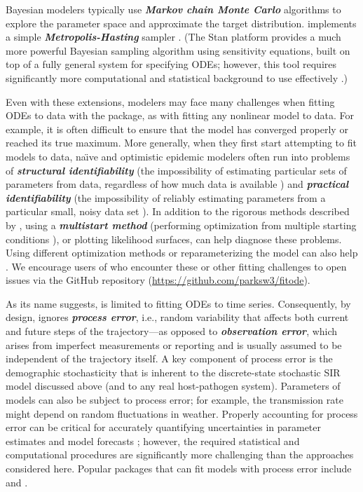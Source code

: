 \documentclass[]{interact}\usepackage[]{graphicx}\usepackage[]{xcolor}
\theoremstyle{plain}%
\theoremstyle{definition}
\theoremstyle{remark}
\newcommand{\term}[1]{{\bfseries\slshape#1}}
\newcommand{\code}[1]{\texttt{\detokenize{#1}}}
\begin{document}
\begin{description}
  Bayesian modelers typically use \term{Markov chain Monte Carlo}
  algorithms to explore the parameter space and approximate the target
  distribution. \code{fitode} implements a simple
  \term{Metropolis-Hasting} sampler \citep[\S7.3.1]{Bolk08}.  (The
  Stan platform provides a much more powerful Bayesian sampling
  algorithm using sensitivity equations, built on top of a fully
  general system for specifying ODEs; however, this tool requires
  significantly more computational and statistical background to use
  effectively \citep{Grin+2021}.)

\end{description}

Even with these extensions, modelers may face many challenges when
fitting ODEs to data with the \code{fitode} package, as with fitting
any nonlinear model to data.  For example, it is often difficult to
ensure that the model has converged properly or reached its true
maximum.  More generally, 
when they first
start attempting to fit models to data,
na\"{\i}ve and optimistic epidemic modelers often
run into problems of \term{structural identifiability} (the
impossibility of estimating particular sets of parameters from data,
regardless of how much data is available
\citep{TuncTrang2018,Chow+2023}) and \term{practical identifiability}
(the impossibility of reliably estimating parameters from a particular
small, noisy data set \citep{Gall+2022, Chow+2023}).  In addition to the rigorous
methods described by \citet{Chow+2023}, using a \term{multistart
  method} (performing optimization from multiple starting conditions
\citep{raue2013lessons}), or plotting likelihood surfaces, can help
diagnose these problems.  Using different optimization methods or
reparameterizing the model can also help
\citep{raue2013lessons,Bolk+2013}.  We encourage users of
\code{fitode} who encounter these or other fitting challenges to open
issues via the \code{fitode} GitHub repository
(\url{https://github.com/parksw3/fitode}).

As its name suggests, \code{fitode} is limited to fitting ODEs to time
series.  Consequently, by design, \code{fitode} ignores \term{process
  error}, i.e., random variability that affects both current and
future steps of the trajectory---as opposed to \term{observation
  error}, which arises from imperfect measurements or reporting and is
usually assumed to be independent of the trajectory itself.  A key
component of process error is the demographic stochasticity that is
inherent to the discrete-state stochastic SIR model discussed above
(and to any real host-pathogen system).  Parameters of models can also
be subject to process error; for example, the transmission rate might
depend on random fluctuations in weather.  Properly accounting for
process error can be critical for accurately quantifying uncertainties
in parameter estimates and model forecasts
\citep{King+15,taylor2016stochasticity,li2018fitting}; however, the
required statistical and computational procedures are significantly
more challenging than the approaches considered here.  Popular
\code{R} packages that can fit models with process error include
\code{pomp} \citep{King+16} and \code{mcstate} \citep{mcstate}.
\end{document}
